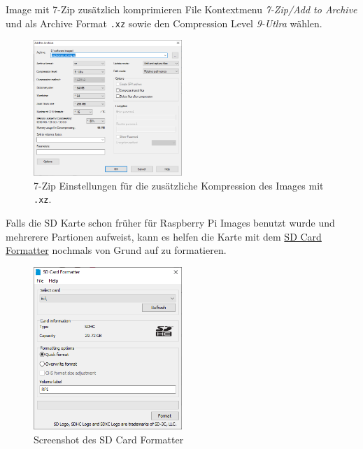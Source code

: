 \documentclass[
  11pt,
  a4paper,
  oneside, openany  ,captions=tableheading
]{scrbook}
\theoremstyle{remark}
\begin{document}
Image mit 7-Zip zusätzlich komprimieren File Kontextmenu \emph{7-Zip/Add
to Archive} und als Archive Format \texttt{.xz} sowie den Compression
Level \emph{9-Utlra} wählen.

\begin{figure}[H]

{\centering \includegraphics[width=0.5\textwidth,height=\textheight]{images/raspberrypi_image_verkleinern_05.png}

}

\caption{7-Zip Einstellungen für die zusätzliche Kompression des Images
mit \texttt{.xz}.}

\end{figure}%

Falls die SD Karte schon früher für Raspberry Pi Images benutzt wurde
und mehrerere Partionen aufweist, kann es helfen die Karte mit dem
\href{https://www.sdcard.org/downloads/formatter/}{SD Card Formatter}
nochmals von Grund auf zu formatieren.

\begin{figure}[H]

{\centering \includegraphics[width=0.5\textwidth,height=\textheight]{images/raspberrypi_image_verkleinern_06.png}

}

\caption{Screenshot des SD Card Formatter}

\end{figure}%

\backmatter

\printindex
\end{document}
